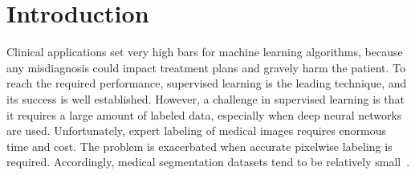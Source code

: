 \documentclass{llncs}
\begin{document}
\section{Introduction}
\vspace*{-0.2cm}

Clinical applications set very high bars for machine learning algorithms, because any misdiagnosis could impact treatment plans and gravely harm the patient. %
To reach the required performance, supervised learning is the leading technique, and its success is well established. However, a challenge in supervised learning is that it requires a large amount of labeled data, especially when deep neural networks are used. %
Unfortunately, expert labeling of medical images requires enormous time and cost. The problem is exacerbated when accurate pixelwise labeling is required. Accordingly, medical segmentation datasets tend to be relatively small~\cite{sirinukunwattana2017gland,zhang2016coarse}.  
\end{document}
